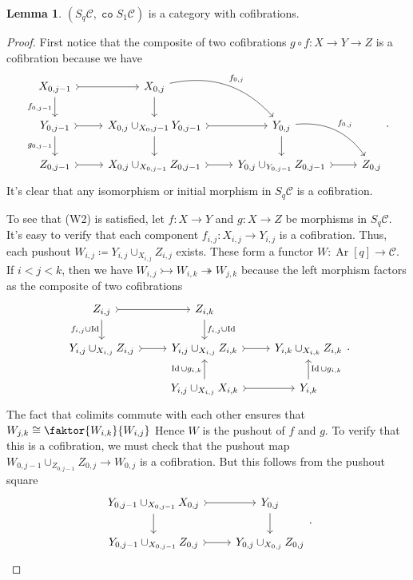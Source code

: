 \documentclass[10pt,letterpaper,cm]{nupset}
\theoremstyle{definition}
\theoremstyle{theorem}
\newtheorem{lemma}[definition]{Lemma}
\theoremstyle{remark}
\newcommand{\1}{\mathbf{1}}
\renewcommand{\c}{\mathscr{C}}
\newcommand{\0}{\vec 0}
\DeclareMathOperator{\id}{Id}
\DeclareMathOperator{\co}{\mathtt{co}}
\DeclareMathOperator{\Ar}{Ar}
\begin{document}
\begin{lemma}
$\left(S_q\c, \co{S_1} \c\right)$ is a category with cofibrations. 
\end{lemma}
\begin{proof}
First notice that the composite of two cofibrations $g \circ f : X \to Y \to Z$ is a cofibration because we have
\[
\begin{tikzcd}
{X_{0, j-1}} \arrow[r, tail] \arrow[d, "{f_{0, j-1}}"'] & {X_{0, j}} \arrow[d] \arrow[rd, "{f_{0, j}}", bend left] &  &  \\
{Y_{0, j-1}} \arrow[d, "{g_{0, j-1}}"'] \arrow[r, tail] & {X_{0, j} \cup_{X_0, j-1} Y_{0, j-1}} \arrow[d] \arrow[r, tail] & {Y_{0, j}} \arrow[d] \arrow[rd, "{f_{0, j}}", bend left] &  \\
{Z_{0, j-1}} \arrow[r, tail] & {X_{0, j} \cup_{X_{0, j-1}} Z_{0, j-1}} \arrow[r, tail] & {Y_{0, j} \cup_{Y_{0, j-1}} Z_{0, j-1}} \arrow[r, tail] & {Z_{0, j}}
\end{tikzcd}.
\]
It's clear that any isomorphism or initial morphism in $S_q \c$ is a cofibration.

\medskip


To see that (W2) is satisfied, let $f: X \to Y$ and $g : X \to Z$ be morphisms in $S_q \c$. It's easy to verify that each component $f_{i, j}: X_{i, j} \to Y_{i, j}$ is a cofibration. Thus, each pushout $W_{i, j} \coloneqq Y_{i,j} \cup_{X_{i,j}} Z_{i, j}$ exists.
These form a functor $W: \Ar[q] \to \c$. If $i < j < k$, then we have $W_{i,j} \rightarrowtail W_{i, k} \twoheadrightarrow W_{j,k}$ because the left morphism factors as the composite of two cofibrations
\[
\begin{tikzcd}
{Z_{i,j}} \arrow[d, "{f_{i,j} \cup \id}"'] \arrow[r, tail] & {Z_{i,k}} \arrow[d, "{f_{i,j} \cup \id}"] &  \\
{Y_{i,j} \cup_{X_{i,j}} Z_{i,j}} \arrow[r, tail] & {Y_{i,j} \cup_{X_{i,j}} Z_{i,k}} \arrow[r, tail] & {Y_{i,k} \cup_{X_{i,k}} Z_{i,k}} \\
 & {Y_{i,j} \cup_{X_{i,j}} X_{i,k}} \arrow[u, "{\id \cup g_{i,k}}"] \arrow[r, tail] & {Y_{i,k}} \arrow[u, "{\id \cup g_{i,k}}"']
\end{tikzcd}
.\] The fact that colimits commute with each other ensures that $W_{j,k} \cong \faktor{W_{i,k}}{W_{i,j}}$ Hence $W$ is the pushout of $f$ and $g$. To verify that this is a cofibration, we must check that the pushout map $W_{0, j-1} \cup_{Z_{0, j-1}} Z_{0, j} \to W_{0, j}$ is a cofibration. But this follows from the pushout square
\[
\begin{tikzcd}
{Y_{0, j-1}\cup_{X_{0, j-1}} X_{0, j}} \arrow[d] \arrow[r, tail] & {Y_{0, j}} \arrow[d] \\
{Y_{0, j-1}\cup_{X_{0, j-1}} Z_{0, j}} \arrow[r, tail] & {Y_{0, j}\cup_{X_{0, j}} Z_{0, j}}
\end{tikzcd}
.\]
\end{proof}
\end{document}
